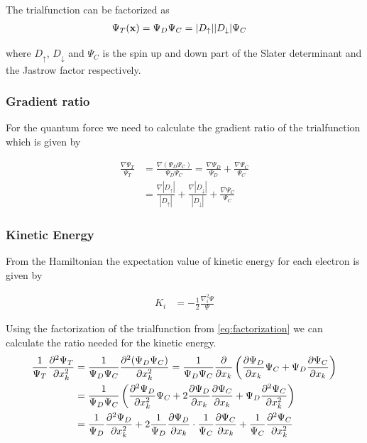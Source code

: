 \documentclass[11pt]{article}
\begin{document}
		The trialfunction can be factorized as
		\begin{align}
			\Psi_T(\vb{x}) &= \Psi_{D} \Psi_C= |D_\uparrow| |D_\downarrow| \Psi_C \label{eq:factorization}
		\end{align}

		where \(D_\uparrow\), \(D_\downarrow\) and \(\Psi_C\) is the spin up and down part of the Slater determinant and the Jastrow factor respectively.

		\subsubsection{Gradient ratio}
			For the quantum force we need to calculate the gradient ratio of the trialfunction which is given by

			\begin{align}
				\frac{\nabla \Psi_T}{ \Psi_T } &= \frac{\nabla( \Psi_D\Psi_C  )}{ \Psi_D\Psi_C } = \frac{ \nabla \Psi_D }{\Psi_D } + \frac{\nabla \Psi_C}{\Psi_C}
				\\
				&= \frac{\nabla |D_\uparrow|}{|D_\uparrow|} + \frac{ \nabla |D_\downarrow|}{|D_\downarrow|} + \frac{\nabla \Psi_C}{\Psi_C}
			\end{align}

		\subsubsection{Kinetic Energy}
			From the Hamiltonian the expectation value of kinetic energy for each electron is given by

			\begin{align}
				K_i &= - \frac{1}{2} \frac{\nabla^2_i \Psi}{\Psi}
			\end{align}

				Using the factorization of the trialfunction from \eqref{eq:factorization} we can calculate the ratio needed for the kinetic energy.
			\begin{align}
				\frac{1}{\Psi_T}\pdv[2]{\Psi_T}{x_k} &= \frac{1}{\Psi_D\Psi_C} \pdv[2]{(\Psi_D\Psi_C)}{x_k} = \frac{1}{\Psi_D\Psi_C} \pdv{}{x_k} \left( \pdv{\Psi_D}{x_k} \Psi_C +\Psi_D \pdv{\Psi_C}{x_k} \right)
				\\
				&= \frac{ 1 }{\Psi_D\Psi_C} \left( \pdv[2]{\Psi_D}{x_k} \Psi_C   + 2 \pdv{ \Psi_D }{x_k}\pdv{ \Psi_C }{x_k} + \Psi_D\pdv[2]{\Psi_C}{x_k} \right)
				\\
				&= \frac{1}{\Psi_D}\pdv[2]{\Psi_D}{x_k}  + 2 \frac{1}{\Psi_D} \pdv{ \Psi_D }{x_k} \cdot \frac{1}{\Psi_C}\pdv{ \Psi_C }{x_k} +  \frac{1}{\Psi_C}\pdv[2]{\Psi_C}{x_k} \label{eq:laplacianIntermediate}
			\end{align}
\end{document}
